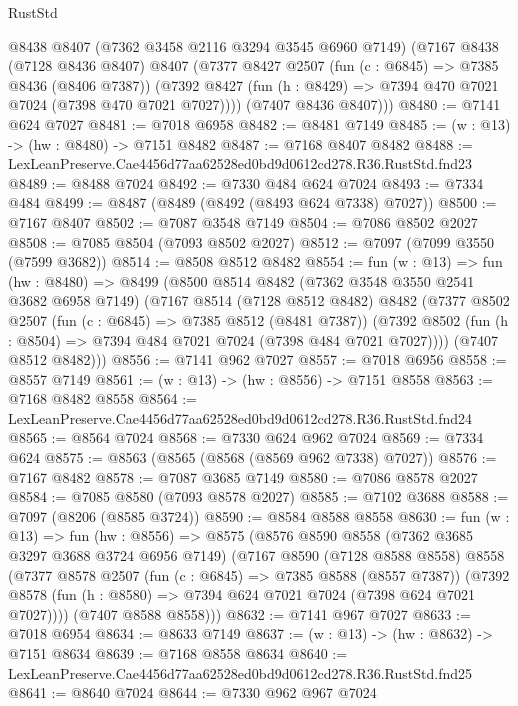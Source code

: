 \begin{lexlean}{RustStd}
\begin{coremodule}
      @8438
      @8407
      (@7362 @3458 @2116 @3294 @3545 @6960 @7149)
      (@7167
        @8438
        (@7128 @8436 @8407)
        @8407
        (@7377
          @8427
          @2507
          (fun (c : @6845) => @7385 @8436 (@8406 @7387))
          (@7392 @8427 (fun (h : @8429) => @7394 @470 @7021 @7024 (@7398 @470 @7021 @7027))))
        (@7407 @8436 @8407)))
@8480 := @7141 @624 @7027
@8481 := @7018 @6958
@8482 := @8481 @7149
@8485 := (w : @13) -> (hw : @8480) -> @7151 @8482
@8487 := @7168 @8407 @8482
@8488 := LexLeanPreserve.Cae4456d77aa62528ed0bd9d0612cd278.R36.RustStd.fnd23
@8489 := @8488 @7024
@8492 := @7330 @484 @624 @7024
@8493 := @7334 @484
@8499 := @8487 (@8489 (@8492 (@8493 @624 @7338) @7027))
@8500 := @7167 @8407
@8502 := @7087 @3548 @7149
@8504 := @7086 @8502 @2027
@8508 := @7085 @8504 (@7093 @8502 @2027)
@8512 := @7097 (@7099 @3550 (@7599 @3682))
@8514 := @8508 @8512 @8482
@8554 := fun (w : @13) =>
  fun (hw : @8480) =>
  @8499
    (@8500
      @8514
      @8482
      (@7362 @3548 @3550 @2541 @3682 @6958 @7149)
      (@7167
        @8514
        (@7128 @8512 @8482)
        @8482
        (@7377
          @8502
          @2507
          (fun (c : @6845) => @7385 @8512 (@8481 @7387))
          (@7392 @8502 (fun (h : @8504) => @7394 @484 @7021 @7024 (@7398 @484 @7021 @7027))))
        (@7407 @8512 @8482)))
@8556 := @7141 @962 @7027
@8557 := @7018 @6956
@8558 := @8557 @7149
@8561 := (w : @13) -> (hw : @8556) -> @7151 @8558
@8563 := @7168 @8482 @8558
@8564 := LexLeanPreserve.Cae4456d77aa62528ed0bd9d0612cd278.R36.RustStd.fnd24
@8565 := @8564 @7024
@8568 := @7330 @624 @962 @7024
@8569 := @7334 @624
@8575 := @8563 (@8565 (@8568 (@8569 @962 @7338) @7027))
@8576 := @7167 @8482
@8578 := @7087 @3685 @7149
@8580 := @7086 @8578 @2027
@8584 := @7085 @8580 (@7093 @8578 @2027)
@8585 := @7102 @3688
@8588 := @7097 (@8206 (@8585 @3724))
@8590 := @8584 @8588 @8558
@8630 := fun (w : @13) =>
  fun (hw : @8556) =>
  @8575
    (@8576
      @8590
      @8558
      (@7362 @3685 @3297 @3688 @3724 @6956 @7149)
      (@7167
        @8590
        (@7128 @8588 @8558)
        @8558
        (@7377
          @8578
          @2507
          (fun (c : @6845) => @7385 @8588 (@8557 @7387))
          (@7392 @8578 (fun (h : @8580) => @7394 @624 @7021 @7024 (@7398 @624 @7021 @7027))))
        (@7407 @8588 @8558)))
@8632 := @7141 @967 @7027
@8633 := @7018 @6954
@8634 := @8633 @7149
@8637 := (w : @13) -> (hw : @8632) -> @7151 @8634
@8639 := @7168 @8558 @8634
@8640 := LexLeanPreserve.Cae4456d77aa62528ed0bd9d0612cd278.R36.RustStd.fnd25
@8641 := @8640 @7024
@8644 := @7330 @962 @967 @7024

\end{coremodule}
\end{lexlean}
